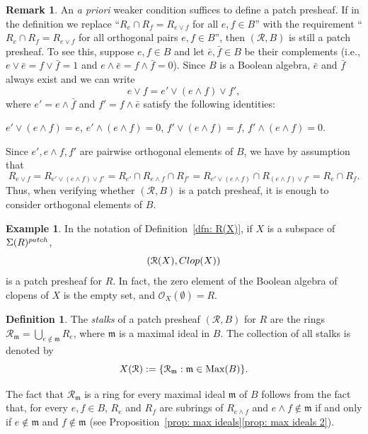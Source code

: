 \documentclass[11pt]{amsart}
\def\m{{\mathfrak m}} %
\def\O{{\mathcal{O}}}
\theoremstyle{definition}
\newtheorem{definition}[theorem]{Definition}
\newtheorem{remark}[theorem]{Remark}
\newtheorem{example}[theorem]{Example}
\def\ff{\mathfrak}
\def\Max{\mbox{\rm Max}}
\def\cal{\mathcal}
\begin{document}
\begin{remark} \label{orthogonal is enough}
An {\it a priori} weaker condition suffices to define a patch presheaf. If in the definition we replace ``$R_e \cap R_f = R_{e \vee f}$ for all $e,f \in B$'' with the requirement ``$R_{e} \cap R_f = R_{e \vee f}$ for all orthogonal pairs $e,f \in B$'', then  $({\cal R}, B)$ is still a patch presheaf. To see this, suppose $e,f \in B$ and let $\bar{e},\bar{f}\in B$ be their complements (i.e., $e\vee \bar{e}=f\vee \bar{f}=1$ and $e\wedge \bar{e}=f\wedge\bar{f}=0$). Since $B$ is a Boolean algebra, $\bar{e}$ and $\bar{f}$ always exist and we can write $$e \vee f = e' \vee (e \wedge f) \vee f',$$ where $e'=e\wedge \bar{f}$ and $f'=f\wedge \bar{e}$ satisfy the following identities:
\begin{center} $ e' \vee (e \wedge f) =e$, $e' \wedge (e \wedge f) = 0$,    $ f' \vee (e \wedge f) =f$, $f' \wedge (e \wedge f) = 0$.
\end{center}
Since $e',e \wedge f, f'$ are pairwise orthogonal elements of $B$, we have by assumption that $$R_{e \vee f} = R_{ e' \vee (e \wedge f) \vee f'} = R_{e'} \cap R_{e \wedge f} \cap R_{f'} = R_{e' \vee (e \wedge f)} \cap R_{(e \wedge f)\vee f'}=R_e \cap R_f.$$
Thus, when verifying whether $({\cal R}, B)$ is a patch presheaf, it is enough to consider orthogonal elements of $B$.
 \end{remark} 

 \begin{example}\label{ex: patch presheaf}
 In the notation of Definition~\ref{dfn: R(X)}, if $X$ is a subspace of ${\Sigma}(R)^{\rm patch}$,  $$({\cal R}(X), {\rm Clop}(X))$$ is a patch presheaf for $R$.  In fact, the zero element of the Boolean algebra of clopens of $X$ is the empty set, and $\O_X(\emptyset) = R$.
 \end{example} 


\begin{definition}\label{dfn: stalks} The {\it stalks} of a patch presheaf $({\cal R}, B)$ for $R$ are the rings ${\cal R}_{\m} = \bigcup_{e \not \in {\ff m}} R_e$, where ${\mathfrak{m}}$ is a maximal ideal in $B$. The collection of all stalks is denoted by 
$${X}({\mathcal R})  :=   \{{\cal R}_{\m}:\m \in \Max(B)\}.$$
\end{definition}
The fact that ${\cal R}_\m$ is a ring for every maximal ideal $\m$ of $B$ follows from the fact that, for every $e,f\in B$, $R_e$ and $R_f$ are subrings of $R_{e\wedge f}$ and $e\wedge f\not\in \m$ if and only if $e\not \in \m$ and $f\not \in \m$ (see Proposition~\ref{prop: max ideals}\ref{prop: max ideals 2}).
\end{document}
